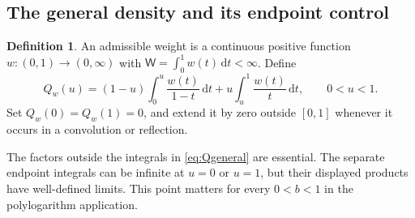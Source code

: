 \documentclass[11pt]{article}
\numberwithin{equation}{section}
\theoremstyle{definition}
\newtheorem{definition}[theorem]{Definition}
\theoremstyle{remark}
\newcommand{\dd}{\,\mathrm d}
\newcommand{\Qw}{Q_w}
\newcommand{\Wtot}{\mathsf W}
\begin{document}
\subsection{The general density and its endpoint control}
\begin{definition}\label{def:w}
An admissible weight is a continuous positive function
$w:(0,1)\to(0,\infty)$ with
$\Wtot=\int_0^1w(t)\dd t<\infty$. Define
\begin{equation}\label{eq:Qgeneral}
 \Qw(u)=(1-u)\int_0^u\frac{w(t)}{1-t}\dd t
             +u\int_u^1\frac{w(t)}t\dd t,\qquad 0<u<1.
\end{equation}
Set $\Qw(0)=\Qw(1)=0$, and extend it by zero outside $[0,1]$ whenever
it occurs in a convolution or reflection.
\end{definition}

The factors outside the integrals in \eqref{eq:Qgeneral} are essential.
The separate endpoint integrals can be infinite at $u=0$ or $u=1$,
but their displayed products have well-defined limits. This point
matters for every $0<b<1$ in the polylogarithm application.
\end{document}
